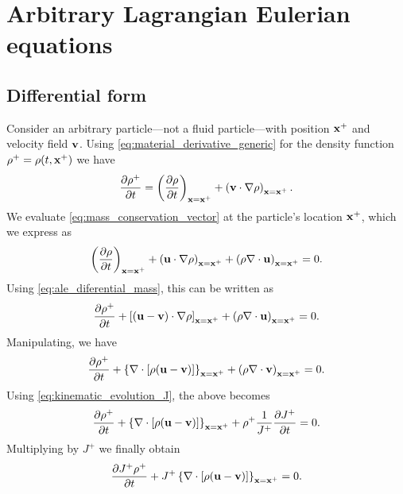 \documentclass[oneside,a4paper,11pt]{report}
\begin{document}
\section{Arbitrary Lagrangian Eulerian equations}
\subsection{Differential form} 
Consider an arbitrary particle---not a fluid particle---with position $\mathbf{x}^+$ and velocity field $\mathbf{v}$. Using \cref{eq:material_derivative_generic} for the density function $\rho^+ = \rho(t,\mathbf{x}^+)$ we have
\begin{equation}
\label{eq:ale_diferential_mass}
    \frac{\partial \rho^+}{\partial t} = \left (\frac{\partial \rho}{\partial t} \right)_{\mathbf{x} = \mathbf{x}^+} + \left (\mathbf{v} \cdot \nabla \rho \right)_{\mathbf{x} = \mathbf{x}^+} .
\end{equation}
We evaluate \cref{eq:mass_conservation_vector} at the particle's location $\mathbf{x}^+$, which we express as
\begin{equation*}
    \left ( \frac{\partial \rho}{\partial t} \right)_{\mathbf{x} = \mathbf{x}^+} + \left ( \mathbf{u} \cdot \nabla \rho \right)_{\mathbf{x} = \mathbf{x}^+} + \left ( \rho \nabla \cdot \mathbf{u} \right)_{\mathbf{x} = \mathbf{x}^+}= 0.
\end{equation*}
Using \cref{eq:ale_diferential_mass}, this can be written as
\begin{equation*}
    \frac{\partial \rho^+}{\partial t} + \left [ ( \mathbf{u} - \mathbf{v}) \cdot \nabla \rho \right]_{\mathbf{x} = \mathbf{x}^+} + \left (\rho \nabla \cdot \mathbf{u} \right)_{\mathbf{x} = \mathbf{x}^+}= 0.
\end{equation*}
Manipulating, we have
\begin{equation*}
    \frac{\partial \rho^+}{\partial t} + \left \{ \nabla \cdot [ \rho ( \mathbf{u} - \mathbf{v}) ] \right \}_{\mathbf{x} = \mathbf{x}^+} + \left (\rho \nabla \cdot \mathbf{v} \right)_{\mathbf{x} = \mathbf{x}^+}= 0.
\end{equation*}
Using \cref{eq:kinematic_evolution_J}, the above becomes
\begin{equation*}
    \frac{\partial \rho^+}{\partial t} + \left \{ \nabla \cdot [ \rho ( \mathbf{u} - \mathbf{v}) ] \right \}_{\mathbf{x} = \mathbf{x}^+} + \rho^+ \frac{1}{J^+} \frac{\partial J^+}{\partial t}= 0.
\end{equation*}
Multiplying by $J^+$ we finally obtain 
\begin{equation}
    \label{eq:ale_differential_mass_conservation}
    \frac{\partial J^+ \rho^+}{\partial t} + J^+ \left \{ \nabla \cdot [ \rho ( \mathbf{u} - \mathbf{v}) ] \right \}_{\mathbf{x} = \mathbf{x}^+} = 0.
\end{equation}
\end{document}
